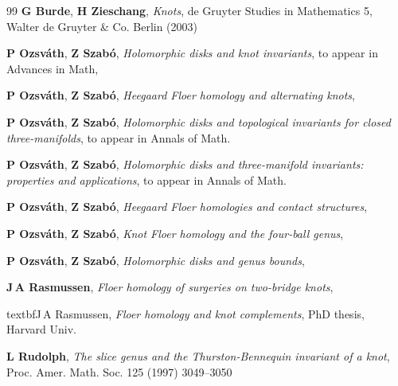 \documentclass{gtart_h}
\theoremstyle{definition}
\begin{document}
\begin{thebibliography}{99}
\textbf{G Burde}, \textbf{H Zieschang}, \emph{Knots}, de Gruyter Studies in
  Mathematics 5, Walter de Gruyter \& Co. Berlin (2003) 

  \textbf{P Ozsv{\'a}th}, \textbf{Z Szab{\'o}}, 
\emph{Holomorphic disks and knot invariants}, to appear in Advances in Math,

\textbf{P Ozsv{\'a}th}, \textbf{Z Szab{\'o}}, \emph{Heegaard {F}loer homology
  and alternating knots},  

 \textbf{P Ozsv{\'a}th}, \textbf{Z Szab{\'o}},
\emph{Holomorphic disks and topological invariants for closed
three-manifolds}, to appear in Annals of Math. 

 \textbf{P Ozsv{\'a}th}, \textbf{Z Szab{\'o}},
\emph{Holomorphic disks and three-manifold invariants: properties and
applications}, to appear in Annals of Math. 

 \textbf{P Ozsv{\'a}th}, \textbf{Z Szab{\'o}}, 
\emph{Heegaard Floer homologies and contact structures},

\textbf{P Ozsv{\'a}th}, \textbf{Z Szab{\'o}}, \emph{Knot {F}loer homology and
  the four-ball genus},  

\textbf{P Ozsv{\'a}th}, \textbf{Z Szab{\'o}}, \emph{Holomorphic disks and genus
  bounds},  

\textbf{J\,A Rasmussen}, \emph{Floer homology of surgeries on two-bridge
  knots},  

 textbf{J\,A Rasmussen}, \emph{Floer homology and knot
complements}, PhD thesis, Harvard Univ. 

\textbf{L Rudolph}, \emph{The slice genus and the {T}hurston-{B}ennequin
  invariant of a knot}, Proc. Amer. Math. Soc. 125 (1997) 3049--3050

\end{thebibliography}
\Addresses\recd
\end{document}
